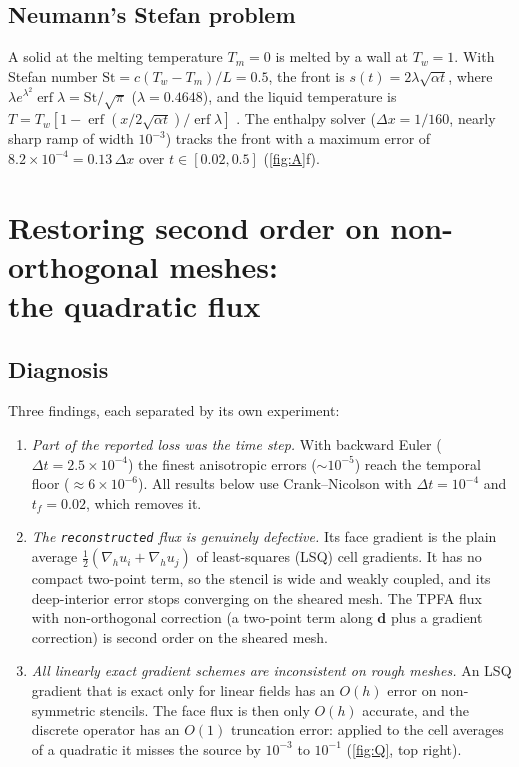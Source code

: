 \documentclass[11pt]{article}
\numberwithin{equation}{section}
\theoremstyle{remark}
\begin{document}
\subsection{Neumann's Stefan problem}

A solid at the melting temperature $T_m=0$ is melted by a wall at $T_w=1$.  With
Stefan number $\mathrm{St}=c(T_w-T_m)/L=0.5$, the front is
$s(t)=2\lambda\sqrt{\alpha t}$, where
$\lambda e^{\lambda^2}\operatorname{erf}\lambda=\mathrm{St}/\sqrt\pi$
($\lambda=0.4648$), and the liquid temperature is
$T=T_w[1-\operatorname{erf}(x/2\sqrt{\alpha t})/\operatorname{erf}\lambda]$
\cite{carslaw1959}.  The enthalpy solver ($\Delta x=1/160$, nearly sharp ramp
of width $10^{-3}$) tracks the front with a maximum error of
$8.2\times10^{-4}=0.13\,\Delta x$ over $t\in[0.02,0.5]$ (\cref{fig:A}f).

\section[Restoring second order: the quadratic flux]{Restoring second order on non-orthogonal meshes:\\ the quadratic flux}
\label{sec:quadratic}

\subsection{Diagnosis}

Three findings, each separated by its own experiment:
\begin{enumerate}[leftmargin=*]
\item \emph{Part of the reported loss was the time step.}  With backward Euler
  ($\Delta t=2.5\times10^{-4}$) the finest anisotropic errors ($\sim10^{-5}$) reach the
  temporal floor ($\approx6\times10^{-6}$).  All results below use Crank--Nicolson with
  $\Delta t=10^{-4}$ and $t_f=0.02$, which removes it.
\item \emph{The \texttt{reconstructed} flux is genuinely defective.}  Its face
  gradient is the plain average $\frac12(\nabla_hu_i+\nabla_hu_j)$ of
  least-squares (LSQ) cell gradients.  It has no compact two-point term, so the
  stencil is wide and weakly coupled, and its deep-interior error stops
  converging on the sheared mesh.  The TPFA flux with non-orthogonal correction
  (a two-point term along $\bm d$ plus a gradient correction) is second order
  on the sheared mesh.
\item \emph{All linearly exact gradient schemes are inconsistent on rough
  meshes.}  An LSQ gradient that is exact only for linear fields has an
  $O(h)$ error on non-symmetric stencils.  The face flux is then only $O(h)$
  accurate, and the discrete operator has an $O(1)$ truncation error: applied
  to the cell averages of a quadratic it misses the source by $10^{-3}$ to
  $10^{-1}$ (\cref{fig:Q}, top right).
\end{enumerate}
\end{document}
